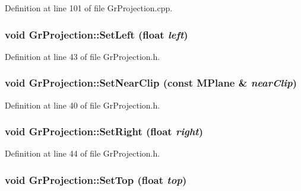 Definition at line 101 of file GrProjection.cpp.\hypertarget{class_gr_projection_142d79699a01bc461466dccfcc3782ae}{
\subsubsection[{SetLeft}]{\setlength{\rightskip}{0pt plus 5cm}void GrProjection::SetLeft (float {\em left})}}
\label{class_gr_projection_142d79699a01bc461466dccfcc3782ae}




Definition at line 43 of file GrProjection.h.\hypertarget{class_gr_projection_a411d73393ffd79ae827bcad8de91090}{
\subsubsection[{SetNearClip}]{\setlength{\rightskip}{0pt plus 5cm}void GrProjection::SetNearClip (const {\bf MPlane} \& {\em nearClip})}}
\label{class_gr_projection_a411d73393ffd79ae827bcad8de91090}




Definition at line 40 of file GrProjection.h.\hypertarget{class_gr_projection_5173c72eefb3030bbd7cf65be54aabcc}{
\subsubsection[{SetRight}]{\setlength{\rightskip}{0pt plus 5cm}void GrProjection::SetRight (float {\em right})}}
\label{class_gr_projection_5173c72eefb3030bbd7cf65be54aabcc}




Definition at line 44 of file GrProjection.h.\hypertarget{class_gr_projection_6d503181e9a11c369200bc57226aa6e5}{
\subsubsection[{SetTop}]{\setlength{\rightskip}{0pt plus 5cm}void GrProjection::SetTop (float {\em top})}}
\label{class_gr_projection_6d503181e9a11c369200bc57226aa6e5}




